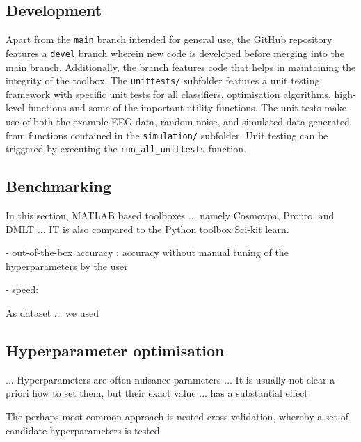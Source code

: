 \documentclass[utf8]{frontiersSCNS} %
\newcommand{\ttt}[1]{\texttt{#1}}
\begin{document}
\subsection{Development}\label{sec:development}

Apart from the \ttt{main} branch intended for general use, the GitHub repository features a \ttt{devel} branch wherein new code is developed before merging into the main branch. Additionally, the branch features code that helps in maintaining the integrity of the toolbox. The \ttt{unittests/} subfolder features a unit testing framework with specific unit tests for all classifiers, optimisation algorithms, high-level functions and some of the important utility functions. The unit tests make use of both the example EEG data, random noise, and simulated data generated from functions contained in the \ttt{simulation/} subfolder. Unit testing can be triggered by executing the \ttt{run\_all\_unittests} function.

\subsection{Benchmarking}\label{sec:benchmarking}

In this section,
MATLAB based toolboxes ...
namely Cosmovpa, Pronto, and DMLT ... IT is also compared to the Python toolbox Sci-kit learn.

- out-of-the-box accuracy : accuracy without manual tuning of the hyperparameters by the user

- speed:

As dataset ... we used



\subsection{Hyperparameter optimisation}


...
Hyperparameters are often nuisance parameters ... It is usually not clear a priori how to set them, but their exact value ... has a substantial effect

The perhaps most common approach is nested cross-validation, whereby a set of candidate hyperparameters is tested
\end{document}
